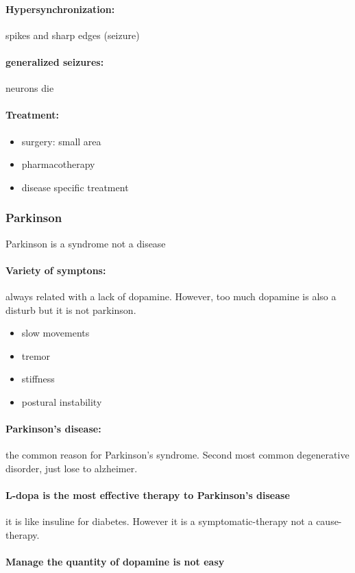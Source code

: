 \documentclass[12pt,article,oneside,a4paper]{memoir}
\begin{document}
\paragraph{Hypersynchronization:} spikes and sharp edges (seizure)
\paragraph{generalized seizures:} neurons die

\paragraph{Treatment:}
\begin{itemize}
\item surgery: small area
\item pharmacotherapy
\item disease specific treatment
\end{itemize}

\subsubsection{Parkinson}
Parkinson is a syndrome not a disease
\paragraph{Variety of symptons:} always related with a lack of dopamine. However, too much dopamine is also a disturb but it is not parkinson.
\begin{itemize}
\item slow movements
\item tremor
\item stiffness
\item postural instability
\end{itemize}

\paragraph{Parkinson's disease:} the common reason for Parkinson's syndrome. Second most common degenerative disorder, just lose to alzheimer.

\paragraph{L-dopa is the most effective therapy to Parkinson's disease} it is like insuline for diabetes. However it is a symptomatic-therapy not a cause-therapy.
\paragraph{Manage the quantity of dopamine is not easy}
\end{document}
